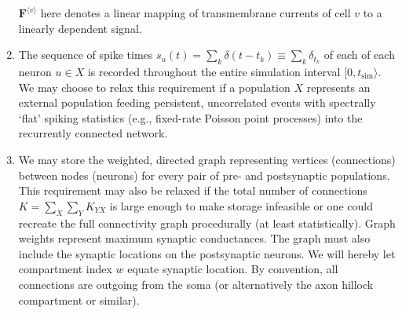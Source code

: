 \begin{enumerate}
$\mathbf{F}^{\langle v \rangle}$ here denotes a linear mapping of transmembrane currents of cell $v$ to a linearly dependent signal.
\item The sequence of spike times $s_u(t) = \sum_k \delta (t - t_k) \equiv \sum_k \delta_{t_k}$ of each of each neuron $u \in X$ is recorded throughout the entire simulation interval $[0, t_\text{sim} \rangle$.
We may choose to relax this requirement if a population $X$ represents an external population feeding persistent, uncorrelated events with spectrally `flat' spiking statistics (e.g., fixed-rate Poisson point processes) into the recurrently connected network. 
\item We may store the weighted, directed graph representing vertices (connections) between nodes (neurons) for every pair of pre- and postsynaptic populations.
This requirement may also be relaxed if the total number of connections $K = \sum_X \sum_Y K_{YX}$ is large enough to make storage infeasible or one could recreate the full connectivity graph procedurally (at least statistically).
Graph weights represent maximum synaptic conductances.
The graph must also include the synaptic locations on the postsynaptic neurons. 
We will hereby let compartment index $w$ equate synaptic location.
By convention, all connections are outgoing from the soma (or alternatively the axon hillock compartment or similar). 
\end{enumerate}


